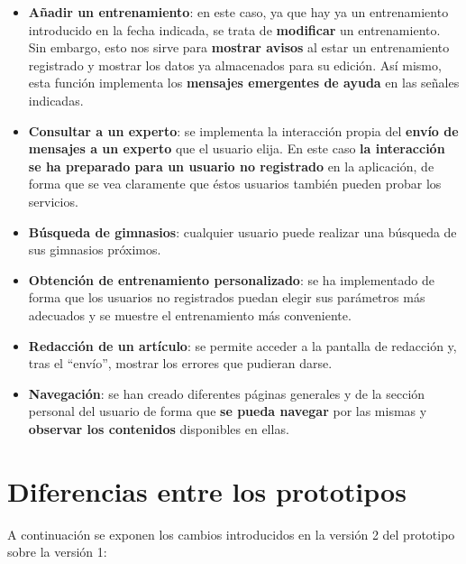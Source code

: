 \documentclass[a4paper]{article}
\begin{document}
\begin{itemize}
	\item   \textbf{Añadir un entrenamiento}: en este caso, ya que hay ya un entrenamiento introducido en la fecha indicada, se trata de \textbf{modificar} un entrenamiento. Sin embargo, esto nos sirve para \textbf{mostrar avisos} al estar un entrenamiento registrado y mostrar los datos ya almacenados para su edición. Así mismo, esta función implementa los \textbf{mensajes emergentes de ayuda} en las señales indicadas.
	
	\item   \textbf{Consultar a un experto}: se implementa la interacción propia del \textbf{envío de mensajes a un experto} que el usuario elija. En este caso \textbf{la interacción se ha preparado para un usuario no registrado} en la aplicación, de forma que se vea claramente que éstos usuarios también pueden probar los servicios.
	
	\item   \textbf{Búsqueda de gimnasios}: cualquier usuario puede realizar una búsqueda de sus gimnasios próximos.
	
	\item   \textbf{Obtención de entrenamiento personalizado}: se ha implementado de forma que los usuarios no registrados puedan elegir sus parámetros más adecuados y se muestre el entrenamiento más conveniente.
	
	\item   \textbf{Redacción de un artículo}: se permite acceder a la pantalla de redacción y, tras el ``envío'', mostrar los errores que pudieran darse.
	
	\item   \textbf{Navegación}: se han creado diferentes páginas generales y de la sección personal del usuario de forma que \textbf{se pueda navegar} por las mismas y \textbf{observar los contenidos} disponibles en ellas.
\end{itemize}

\section{Diferencias entre los prototipos}

A continuación se exponen los cambios introducidos en la versión 2 del prototipo sobre la versión 1:
\end{document}
